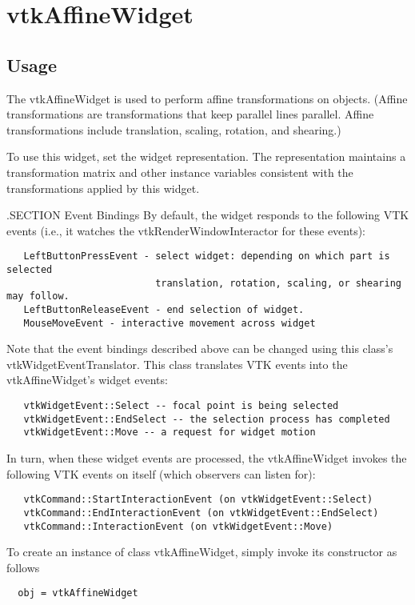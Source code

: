\section{vtkAffineWidget}

\subsection{Usage}

 The vtkAffineWidget is used to perform affine transformations on objects.
 (Affine transformations are transformations that keep parallel lines parallel.
 Affine transformations include translation, scaling, rotation, and shearing.)
 
 To use this widget, set the widget representation. The representation 
 maintains a transformation matrix and other instance variables consistent
 with the transformations applied by this widget.

 .SECTION Event Bindings
 By default, the widget responds to the following VTK events (i.e., it
 watches the vtkRenderWindowInteractor for these events):
 \begin{verbatim}
   LeftButtonPressEvent - select widget: depending on which part is selected
                          translation, rotation, scaling, or shearing may follow.
   LeftButtonReleaseEvent - end selection of widget.
   MouseMoveEvent - interactive movement across widget
 \end{verbatim}

 Note that the event bindings described above can be changed using this
 class's vtkWidgetEventTranslator. This class translates VTK events 
 into the vtkAffineWidget's widget events:
 \begin{verbatim}
   vtkWidgetEvent::Select -- focal point is being selected
   vtkWidgetEvent::EndSelect -- the selection process has completed
   vtkWidgetEvent::Move -- a request for widget motion
 \end{verbatim}

 In turn, when these widget events are processed, the vtkAffineWidget
 invokes the following VTK events on itself (which observers can listen for):
 \begin{verbatim}
   vtkCommand::StartInteractionEvent (on vtkWidgetEvent::Select)
   vtkCommand::EndInteractionEvent (on vtkWidgetEvent::EndSelect)
   vtkCommand::InteractionEvent (on vtkWidgetEvent::Move)
 \end{verbatim}


To create an instance of class vtkAffineWidget, simply
invoke its constructor as follows
\begin{verbatim}
  obj = vtkAffineWidget
\end{verbatim}
